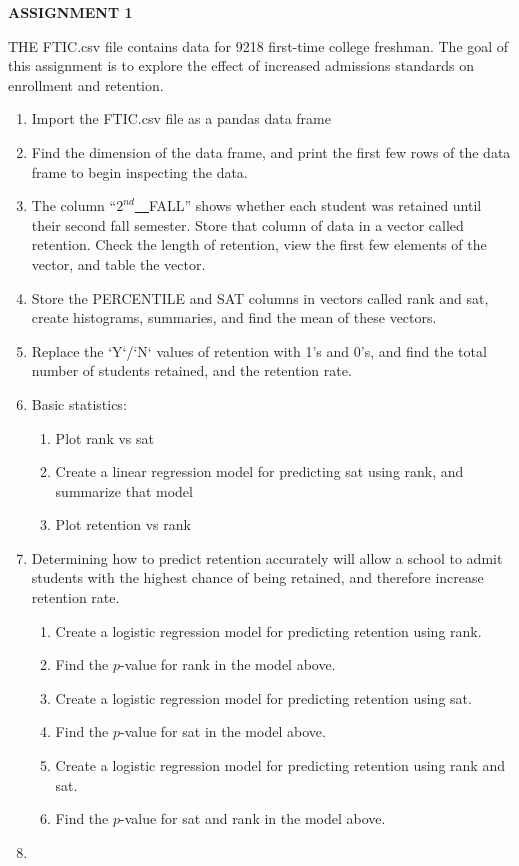 \documentclass[11pt]{article}
\begin{document}
\begin{center}
	\textbf{\Large{ASSIGNMENT 1}}
\end{center}
THE FTIC.csv file contains data for 9218 first-time college freshman.  The goal of this assignment is to explore the effect of increased admissions standards on enrollment and retention.
\begin{enumerate}
	\item Import the FTIC.csv file as a pandas data frame
	\item Find the dimension of the data frame, and print the first few rows of the data frame to begin inspecting the data.
	\item The column ``$2^{nd}$\underline{~~}FALL'' shows whether each student was retained until their second fall semester.  Store that column of data in a vector called retention.  Check the length of retention, view the first few elements of the vector, and table the vector.
	\item Store the PERCENTILE and SAT columns in vectors called rank and sat, create histograms, summaries, and find the mean of these vectors.
	\item Replace the `Y`/`N` values of retention with 1's and 0's, and find the total number of students retained, and the retention rate.
	\item Basic statistics:
		\begin{enumerate}
			\item Plot rank vs sat
			\item Create a linear regression model for predicting sat using rank, and summarize that model
			\item Plot retention vs rank
		\end{enumerate}
	\item Determining how to predict retention accurately will allow a school to admit students with the highest chance of being retained, and therefore increase retention rate.
		\begin{enumerate}
			\item Create a logistic regression model for predicting retention using rank.  
			\item Find the $p$-value for rank in the model above.
			\item Create a logistic regression model for predicting retention using sat.
			\item Find the $p$-value for sat in the model above.
			\item Create a logistic regression model for predicting retention using rank and sat.
			\item Find the $p$-value for sat and rank in the model above.
		\end{enumerate}
	\item 
\end{enumerate}
\end{document}
